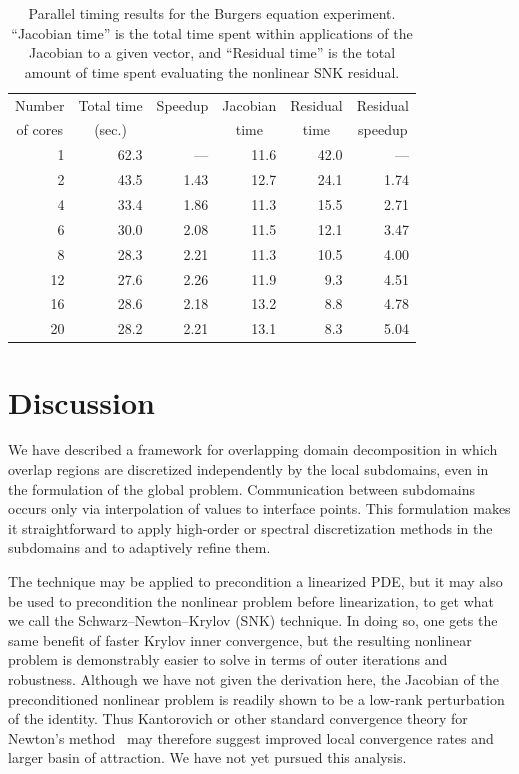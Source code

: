\begin{table}
  \centering
  \begin{tabular}{rrrrrr}
    \multicolumn{1}{c}{Number} & \multicolumn{1}{c}{Total time} & \multicolumn{1}{c}{Speedup} & \multicolumn{1}{c}{Jacobian} & \multicolumn{1}{c}{Residual} & \multicolumn{1}{c}{Residual} \\
    \multicolumn{1}{c}{of cores} & \multicolumn{1}{c}{(sec.)} & \multicolumn{1}{c}{} & \multicolumn{1}{c}{time} & \multicolumn{1}{c}{time} & \multicolumn{1}{c}{speedup} \\
    \hline 
    1 & 62.3 & --- & 11.6 & 42.0 & --- \\
    2 & 43.5 & 1.43 & 12.7 & 24.1 & 1.74 \\
    4 & 33.4 & 1.86 & 11.3 & 15.5 & 2.71 \\
    6 & 30.0 & 2.08 & 11.5 & 12.1 & 3.47 \\
    8 & 28.3 & 2.21 & 11.3 & 10.5 & 4.00 \\
    12 & 27.6 & 2.26 & 11.9 & 9.3 & 4.51 \\
    16 & 28.6 & 2.18 & 13.2 & 8.8 & 4.78 \\
    20 & 28.2 & 2.21 & 13.1 & 8.3 & 5.04   
  \end{tabular}
  \caption{Parallel timing results for the Burgers equation experiment. ``Jacobian time'' is the total time spent within applications of the Jacobian to a given vector, and ``Residual time'' is the total amount of time spent evaluating the nonlinear SNK residual.}
  \label{tab:parallel}
\end{table}


\section{Discussion}
\label{sec:discussion}

We have described a framework for overlapping domain decomposition in which overlap regions are discretized independently by the local subdomains, even in the formulation of the global problem. Communication between subdomains occurs only via interpolation of values to interface points. This formulation makes it straightforward to apply high-order or spectral discretization methods in the subdomains and to adaptively refine them. 

The technique may be applied to precondition a linearized PDE, but it may also be used to precondition the nonlinear problem before linearization, to get what we call the Schwarz--Newton--Krylov (SNK) technique. In doing so, one gets the same benefit of faster Krylov inner convergence, but the resulting nonlinear problem is demonstrably easier to solve in terms of outer iterations and robustness. Although we have not given the derivation here, the Jacobian of the preconditioned nonlinear problem is readily shown to be a low-rank perturbation of the identity. Thus Kantorovich or other standard convergence theory for Newton's method~\cite{Dennis1987} may therefore suggest improved local convergence rates and larger basin of attraction. We have not yet pursued this analysis.

